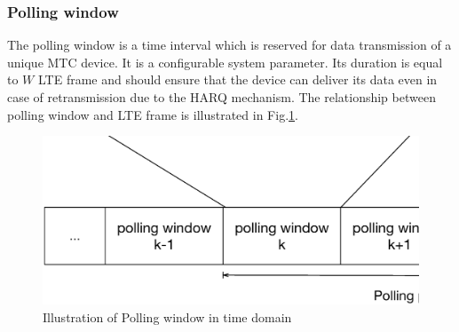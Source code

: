 
\subsubsection{Polling window}
\label{polling-window}
The polling window is a time interval which is reserved for data transmission of a unique MTC device. It is a configurable system parameter. Its duration is equal to $W$ LTE frame and should ensure that the device can deliver its data even in case of retransmission due to the HARQ mechanism.
The relationship between polling window and LTE frame is illustrated in Fig.\ref{fig:Illustration of Polling window in time domain}. 

\begin{figure}[!t]
	\centering
	\includegraphics[width=0.9\linewidth]{Chapter6/Figures/Polling_window_illustration.eps}
	\caption{Illustration of Polling window in time domain}
	\label{fig:Illustration of Polling window in time domain}
\end{figure}

